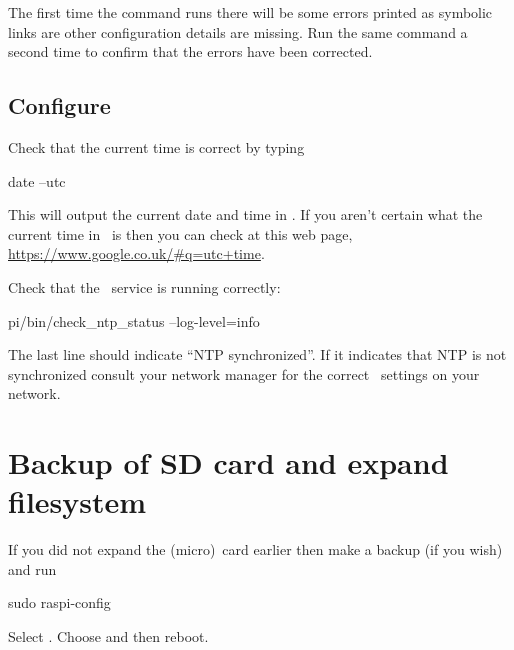 The first time the command runs there will be some errors printed as
symbolic links are other configuration details are missing. Run the
same command a second time to confirm that the errors have been
corrected.


\subsection{Configure \protect{}}
Check that the current time is correct by typing
\begin{Cmd}
date --utc
\end{Cmd}
This will output the current date and time in \utc. If you aren't
certain what the current time in \utc\ is then you can check at this
web page, \url{https://www.google.co.uk/#q=utc+time}.

Check that the \ntp\ service is running correctly:
\begin{Cmd}
\mytilde{}pi/bin/check_ntp_status --log-level=info
\end{Cmd}
The last line should indicate ``NTP synchronized''. If it indicates
that NTP is not synchronized consult your network manager for the
correct \ntp\ settings on your network.



\section{Backup of SD card and expand filesystem}

If you did not expand the (micro)\sd\ card earlier then make a backup
(if you wish) and run
\begin{Cmd}
sudo raspi-config
\end{Cmd}
Select . Choose  and then reboot.
